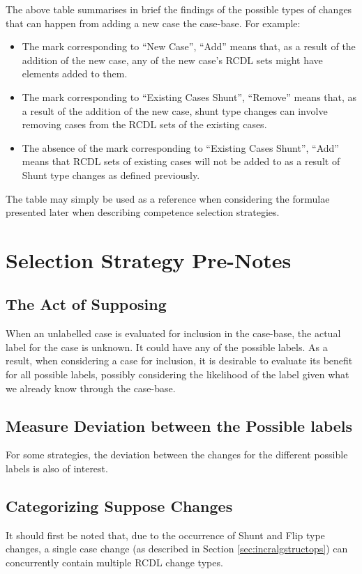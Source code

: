 \documentclass[a4paper,11pt]{report}
\begin{document}
\vspace{12pt}

The above table summarises in brief the findings of the possible types of changes that can happen from adding a new case the case-base. For example:
\begin{itemize}
	\item The mark corresponding to ``New Case'', ``Add'' means that, as a result of the addition of the new case, any of the new case's RCDL sets might have elements added to them.
	\item The mark corresponding to ``Existing Cases Shunt'', ``Remove'' means that, as a result of the addition of the new case, shunt type changes can involve removing cases from the RCDL sets of the existing cases.
	\item The absence of the mark corresponding to ``Existing Cases Shunt'', ``Add'' means that RCDL sets of existing cases will not be added to as a result of Shunt type changes as defined previously.
\end{itemize}

The table may simply be used as a reference when considering the formulae presented later when describing competence selection strategies.

\section{Selection Strategy Pre-Notes}
\subsection{The Act of Supposing\label{sec:actofsupposing}}
When an unlabelled case is evaluated for inclusion in the case-base, the actual label for the case is unknown. It could have any of the possible labels. As a result, when considering a case for inclusion, it is desirable to evaluate its benefit for all possible labels, possibly considering the likelihood of the label given what we already know through the case-base.

\subsection{Measure Deviation between the Possible labels}
For some strategies, the deviation between the changes for the different possible labels is also of interest.

\subsection{Categorizing Suppose Changes}
It should first be noted that, due to the occurrence of Shunt and Flip type changes, a single case change (as described in Section \ref{sec:incralgstructops}) can concurrently contain multiple RCDL change types.
\end{document}
